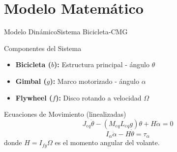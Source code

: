 \documentclass[10pt,xcolor={dvipsnames}]{beamer}
\begin{document}
\section{Modelo Matemático}
\begin{frame}{Modelo Dinámico}{Sistema Bicicleta-CMG}

\begin{block}{Componentes del Sistema}
\begin{itemize}
    \item \textbf{Bicicleta ($b$):} Estructura principal - ángulo $\theta$
    \item \textbf{Gimbal ($g$):} Marco motorizado - ángulo $\alpha$
    \item \textbf{Flywheel ($f$):} Disco rotando a velocidad $\Omega$
\end{itemize}
\end{block}

\begin{center}
\end{center}

\begin{block}{Ecuaciones de Movimiento (linealizadas)}
\begin{equation*}
J_{eq}\ddot{\theta} - (M_{eq}L_{eq}g)\theta + H\dot{\alpha} = 0
\end{equation*}
\begin{equation*}
I_\alpha \ddot{\alpha} - H\dot{\theta} = \tau_\alpha
\end{equation*}
donde $H = I_{fy} \Omega$ es el momento angular del volante.
\end{block}
\end{frame}

\end{document}
